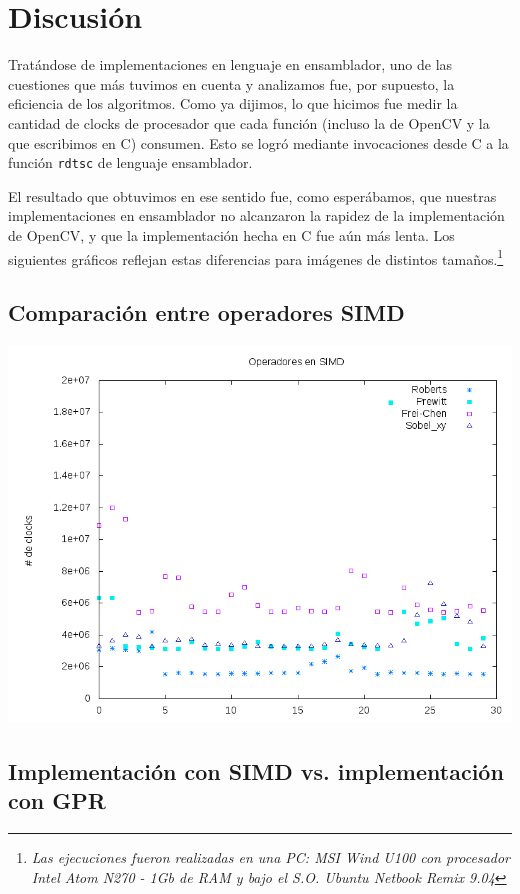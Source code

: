 \section{Discusión}

Tratándose de implementaciones en lenguaje en ensamblador, uno de las cuestiones que más tuvimos en cuenta y analizamos fue, por supuesto, la eficiencia de los algoritmos. Como ya dijimos, lo que hicimos fue medir la cantidad de clocks de procesador que cada función (incluso la de OpenCV y la que escribimos en C) consumen. Esto se logró mediante invocaciones desde C a la función \texttt{rdtsc} de lenguaje ensamblador.

El resultado que obtuvimos en ese sentido fue, como esperábamos, que nuestras implementaciones en ensamblador no alcanzaron la rapidez de la implementación de OpenCV, y que la implementación hecha en C fue aún más lenta. Los siguientes gráficos reflejan estas diferencias para imágenes de distintos tamaños.\footnote{\emph{ Las ejecuciones fueron realizadas en una PC: MSI Wind U100 con procesador Intel Atom N270 - 1Gb de RAM y bajo el S.O. Ubuntu Netbook Remix 9.04}}



\subsection{Comparación entre operadores SIMD}

\includegraphics[scale=0.5]{../resultados/operadores.png}

\subsection{Implementación con SIMD vs. implementación con GPR}

